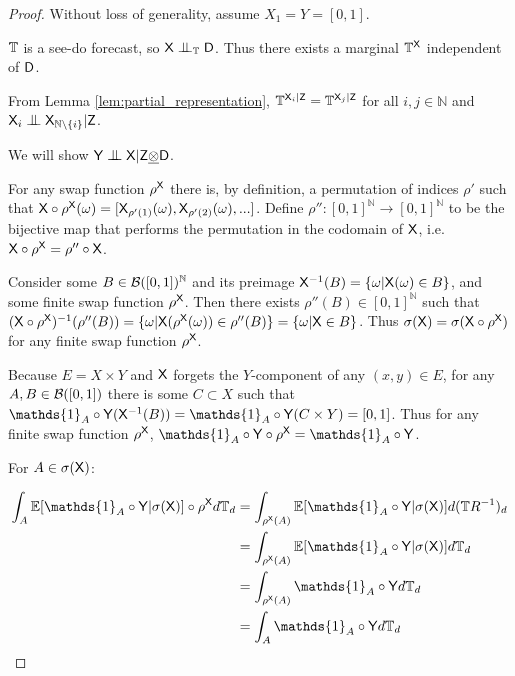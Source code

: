 \begin{proof}

Without loss of generality, assume $X_1=Y=[0,1]$.

$\mathbb{T}$ is a see-do forecast, so $\RV{X}\CI_{\kernel{T}}\RV{D}$. Thus there exists a marginal $\mathbb{T}^{\mathsf{X}}$ independent of $\mathsf{D}$.

From Lemma \ref{lem:partial_representation}, $\mathbb{T}^{\mathsf{X}_i|\mathsf{Z}}=\mathbb{T}^{\mathsf{X}_j|\mathsf{Z}}$ for all $i,j\in \mathbb{N}$ and $\RV{X}_i\CI\RV{X}_{\mathbb{N}\setminus\{i\}} |\RV{Z}$.

We will show $\RV{Y}\CI\RV{X}|\RV{Z}\utimes\RV{D}$. 

For any swap function $\rho^{\mathsf{X}}$ there is, by definition, a permutation of indices $\rho'$ such that $\mathsf{X}\circ\rho^{\mathsf{X}}(\omega) = [\mathsf{X}_{\rho'(1)}(\omega),\mathsf{X}_{\rho'(2)}(\omega),...]$. Define $\rho'':[0,1]^{\mathbb{N}}\to[0,1]^{\mathbb{N}}$ to be the bijective map that performs the permutation in the codomain of $\mathsf{X}$, i.e. $\mathsf{X}\circ\rho^{\mathsf{X}} = \rho''\circ\mathsf{X}$.

Consider some $B\in \mathcal{B}([0,1])^\mathbb{N}$ and its preimage $\mathsf{X}^{-1}(B) = \{\omega|\mathsf{X}(\omega)\in B\}$, and some finite swap function $\rho^{\mathsf{X}}$. Then there exists $\rho''(B)\in [0,1]^{\mathbb{N}}$ such that $(\mathsf{X}\circ\rho^{\mathsf{X}})^{-1}(\rho''(B)) = \{\omega|\mathsf{X}(\rho^{\mathsf{X}}(\omega))\in \rho''(B)\} = \{\omega|\mathsf{X}\in B\}$. Thus $\sigma(\mathsf{X})=\sigma(\mathsf{X}\circ\rho^{\mathsf{X}})$ for any finite swap function $\rho^{\mathsf{X}}$.

Because $E=X\times Y$ and $\mathsf{X}$ forgets the $Y$-component of any $(x,y)\in E$, for any $A,B\in\mathcal{B}([0,1])$ there is some $C\subset X$ such that $\mathds{1}_{A}\circ\RV{Y}(\RV{X}^{-1}(B)) = \mathds{1}_{A}\circ\RV{Y} (C\times Y) = [0,1]$. Thus for any finite swap function $\rho^{\mathsf{X}}$, $\mathds{1}_{A}\circ\RV{Y}\circ \rho^{\RV{X}} = \mathds{1}_{A}\circ\RV{Y}$.

For $A\in \sigma(\mathsf{X})$:

\begin{align}
    \int_{A} \mathbb{E}[\mathds{1}_A\circ\RV{Y}|\sigma(\RV{X})] \circ\rho^{\RV{X}} d\kernel{T}_d &= \int_{\rho^{\RV{X}}(A)} \mathbb{E}[\mathds{1}_A\circ\RV{Y}|\sigma(\RV{X})] d(\kernel{T}R^{-1})_d\\
                                                                         &= \int_{\rho^{\RV{X}}(A)} \mathbb{E}[\mathds{1}_A\circ\RV{Y}|\sigma(\RV{X})] d\kernel{T}_d \\
                                                                         &= \int_{\rho^{\RV{X}}(A)} \mathds{1}_A\circ\RV{Y}d\kernel{T}_d\\
                                                                         &= \int_A \mathds{1}_A\circ\RV{Y} d\kernel{T}_d
\end{align}


\end{proof}
